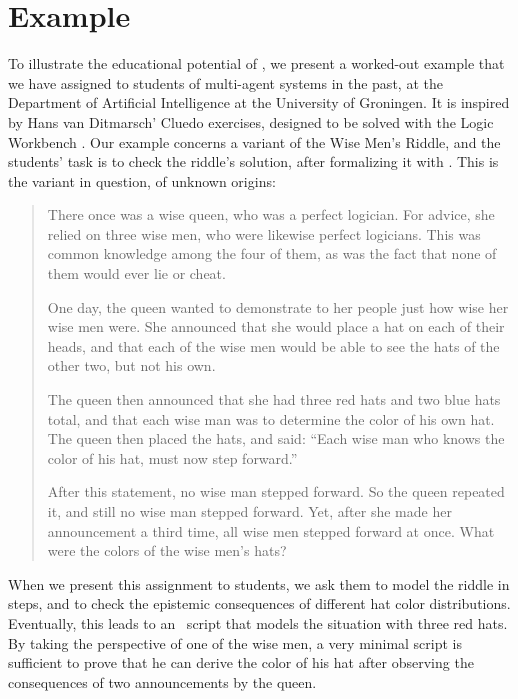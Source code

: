 \section{Example}
\label{sec:example}

To illustrate the educational potential of \oops\/, we present a worked-out example that we have assigned to students of multi-agent systems in the past, at the Department of Artificial Intelligence at the University of Groningen.  It is inspired by Hans van Ditmarsch' Cluedo exercises, designed to be  solved with the Logic Workbench \citep{lwbcluedo}. Our example concerns a variant of the Wise Men's Riddle, and the students' task is to check the riddle's solution, after formalizing it with \oops\/. This is the variant in question, of unknown origins:

\begin{quote}

There once was a wise queen, who was a perfect logician. For advice, she relied on three wise men, who were likewise perfect logicians. This was common knowledge among the four of them, as was the fact that none of them would ever lie or cheat.

One day, the queen wanted to demonstrate to her people just how wise her wise men were. She announced that she would place a hat on each of their heads, and that each of the wise men would be able to see the hats of the other two, but not his own.

The queen then announced that she had three red hats and two blue hats total, and that each wise man was to determine the color of his own hat. The queen then placed the hats, and said: \textquotedblleft Each wise man who knows the color of his hat, must now step forward.\textquotedblright

After this statement, no wise man stepped forward. So the queen repeated it, and still no wise man stepped forward. Yet, after she made her announcement a third time, all wise men stepped forward at once. What were the colors of the wise men's hats?

\end{quote}

When we present this assignment to students, we ask them to model the riddle in steps, and to check the epistemic consequences of different hat color distributions. Eventually, this leads to an \oops\  script that models the situation with three red hats. By taking the perspective of one of the wise men, a very minimal script is sufficient to prove that he can derive the color of his hat after observing the consequences of two announcements by the queen.

